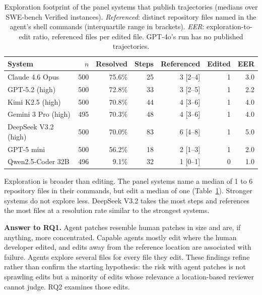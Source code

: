 \documentclass[a4paper,fleqn]{cas-sc}
\newcommand{\rqoneExploreRefMax}{6}
\newcommand{\rqoneExploreRefMin}{1}
\begin{document}
\begin{table}[t]
\caption{Exploration footprint of the panel systems that publish trajectories (medians over SWE-bench Verified instances). \emph{Referenced}: distinct repository files named in the agent's shell commands (interquartile range in brackets). \emph{EER}: exploration-to-edit ratio, referenced files per edited file. GPT-4o's run has no published trajectories.}
\label{tab:explore}
\centering\footnotesize
\begin{tabular}{lrrrrrr}
\toprule
System & $n$ & Resolved & Steps & Referenced & Edited & EER \\
\midrule
Claude 4.6 Opus & 500 & 75.6\% & 25 & 3 [2--4] & 1 & 3.0 \\
GPT-5.2 (high) & 500 & 72.8\% & 33 & 3 [2--5] & 1 & 2.2 \\
Kimi K2.5 (high) & 500 & 70.8\% & 44 & 4 [3--6] & 1 & 4.0 \\
Gemini 3 Pro (high) & 495 & 70.3\% & 48 & 4 [3--6] & 1 & 4.0 \\
DeepSeek V3.2 (high) & 500 & 70.0\% & 83 & 6 [4--8] & 1 & 5.0 \\
GPT-5 mini & 500 & 56.2\% & 18 & 2 [1--3] & 1 & 2.0 \\
Qwen2.5-Coder 32B & 496 & 9.1\% & 32 & 1 [0--1] & 0 & 1.0 \\
\bottomrule
\end{tabular}
\end{table}

Exploration is broader than editing. The panel systems name a median of \rqoneExploreRefMin{} to \rqoneExploreRefMax{} repository files in their commands, but edit a median of one (Table~\ref{tab:explore}). Stronger systems do not explore less. DeepSeek V3.2 takes the most steps and references the most files at a resolution rate similar to the strongest systems.

\begin{answerbox}\textbf{Answer to RQ1.} Agent patches resemble human patches in size and are, if anything, more concentrated. Capable agents mostly edit where the human developer edited, and edits away from the reference location are associated with failure. Agents explore several files for every file they edit. These findings refine rather than confirm the starting hypothesis: the risk with agent patches is not sprawling edits but a minority of edits whose relevance a location-based reviewer cannot judge. RQ2 examines those edits.\end{answerbox}
\end{document}
